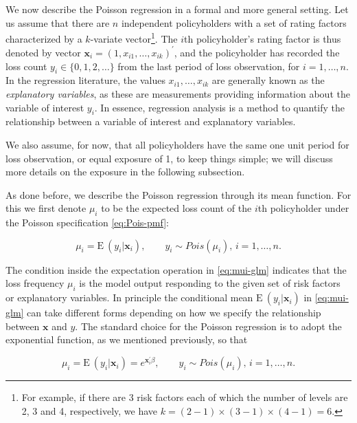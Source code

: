 \documentclass[]{book}
\let\rmarkdownfootnote\footnote%
\def\footnote{\protect\rmarkdownfootnote}
\theoremstyle{definition}
\theoremstyle{definition}
\theoremstyle{definition}
\theoremstyle{remark}
\begin{document}
We now describe the Poisson regression in a formal and more general
setting. Let us assume that there are \(n\) independent policyholders
with a set of rating factors characterized by a \(k\)-variate
vector\footnote{For example, if there are 3 risk factors each of which
  the number of levels are 2, 3 and 4, respectively, we have
  \(k=(2-1)\times(3-1)\times (4-1)=6\).}. The \(i\)th policyholder's
rating factor is thus denoted by vector
\(\mathbf{ x}_i=(1, x_{i1}, \ldots, x_{ik})^{\prime}\), and the
policyholder has recorded the loss count \(y_i \in \{0,1,2, \ldots \}\)
from the last period of loss observation, for \(i=1, \ldots, n\). In the
regression literature, the values \(x_{i1}, \ldots, x_{ik}\) are
generally known as the \emph{explanatory variables}, as these are
measurements providing information about the variable of interest
\(y_i\). In essence, regression analysis is a method to quantify the
relationship between a variable of interest and explanatory variables.

We also assume, for now, that all policyholders have the same one unit
period for loss observation, or equal exposure of 1, to keep things
simple; we will discuss more details on the exposure in the following
subsection.

As done before, we describe the Poisson regression through its mean
function. For this we first denote \(\mu_i\) to be the expected loss
count of the \(i\)th policyholder under the Poisson specification
\eqref{eq:Pois-pmf}:

\begin{equation}
\mu_i=\mathrm{E~}{(y_i|\mathbf{ x}_i)}, \qquad y_i \sim Pois(\mu_i), \, i=1, \ldots, n.
\label{eq:mui-glm}
\end{equation}

The condition inside the expectation operation in \eqref{eq:mui-glm}
indicates that the loss frequency \(\mu_i\) is the model output
responding to the given set of risk factors or explanatory variables. In
principle the conditional mean \(\mathrm{E~}{(y_i|\mathbf{ x}_i)}\) in
\eqref{eq:mui-glm} can take different forms depending on how we specify
the relationship between \(\mathbf{ x}\) and \(y\). The standard choice
for the Poisson regression is to adopt the exponential function, as we
mentioned previously, so that

\begin{equation}
\mu_i=\mathrm{E~}{(y_i|\mathbf{ x}_i)}=e^{\mathbf{ x}^{\prime}_i\beta}, \qquad y_i \sim Pois(\mu_i), \, i=1, \ldots, n.
\label{eq:mean-ft-Pois}
\end{equation}
\end{document}
